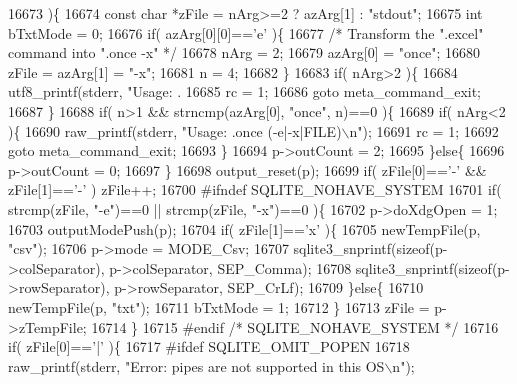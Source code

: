 \begin{DoxyCode}
{{{{{{{{{{{{{{{{{{{{{{{{{{{{{{{{{{{{{{{{{{{{{{{{{{{{{{{{{{{{16673   )\{
16674     \textcolor{keyword}{const} \textcolor{keywordtype}{char} *zFile = nArg>=2 ? azArg[1] : \textcolor{stringliteral}{"stdout"};
16675     \textcolor{keywordtype}{int} bTxtMode = 0;
16676     \textcolor{keywordflow}{if}( azArg[0][0]==\textcolor{charliteral}{'e'} )\{
16677       \textcolor{comment}{/* Transform the ".excel" command into ".once -x" */}
16678       nArg = 2;
16679       azArg[0] = \textcolor{stringliteral}{"once"};
16680       zFile = azArg[1] = \textcolor{stringliteral}{"-x"};
16681       n = 4;
16682     \}
16683     \textcolor{keywordflow}{if}( nArg>2 )\{
16684       utf8_printf(stderr, \textcolor{stringliteral}{"Usage: .%
16685       rc = 1;
16686       \textcolor{keywordflow}{goto} meta\_command\_exit;
16687     \}
16688     \textcolor{keywordflow}{if}( n>1 && strncmp(azArg[0], \textcolor{stringliteral}{"once"}, n)==0 )\{
16689       \textcolor{keywordflow}{if}( nArg<2 )\{
16690         raw_printf(stderr, \textcolor{stringliteral}{"Usage: .once (-e|-x|FILE)\(\backslash\)n"});
16691         rc = 1;
16692         \textcolor{keywordflow}{goto} meta\_command\_exit;
16693       \}
16694       p->outCount = 2;
16695     \}\textcolor{keywordflow}{else}\{
16696       p->outCount = 0;
16697     \}
16698     output_reset(p);
16699     \textcolor{keywordflow}{if}( zFile[0]==\textcolor{charliteral}{'-'} && zFile[1]==\textcolor{charliteral}{'-'} ) zFile++;
16700 \textcolor{preprocessor}{#ifndef SQLITE\_NOHAVE\_SYSTEM}
16701     \textcolor{keywordflow}{if}( strcmp(zFile, \textcolor{stringliteral}{"-e"})==0 || strcmp(zFile, \textcolor{stringliteral}{"-x"})==0 )\{
16702       p->doXdgOpen = 1;
16703       outputModePush(p);
16704       \textcolor{keywordflow}{if}( zFile[1]==\textcolor{charliteral}{'x'} )\{
16705         newTempFile(p, \textcolor{stringliteral}{"csv"});
16706         p->mode = MODE_Csv;
16707         sqlite3_snprintf(\textcolor{keyword}{sizeof}(p->colSeparator), p->colSeparator, SEP_Comma);
16708         sqlite3_snprintf(\textcolor{keyword}{sizeof}(p->rowSeparator), p->rowSeparator, SEP_CrLf);
16709       \}\textcolor{keywordflow}{else}\{
16710         newTempFile(p, \textcolor{stringliteral}{"txt"});
16711         bTxtMode = 1;
16712       \}
16713       zFile = p->zTempFile;
16714     \}
16715 \textcolor{preprocessor}{#endif }\textcolor{comment}{/* SQLITE\_NOHAVE\_SYSTEM */}\textcolor{preprocessor}{}
16716     \textcolor{keywordflow}{if}( zFile[0]==\textcolor{charliteral}{'|'} )\{
16717 \textcolor{preprocessor}{#ifdef SQLITE\_OMIT\_POPEN}
16718       raw_printf(stderr, \textcolor{stringliteral}{"Error: pipes are not supported in this OS\(\backslash\)n"});
}}}}}}}}}}}}}}}}}}}}}}}}}}}}}}}}}}}}}}}}}}}}}}}}}}}}}}}}}}}}}
\end{DoxyCode}
